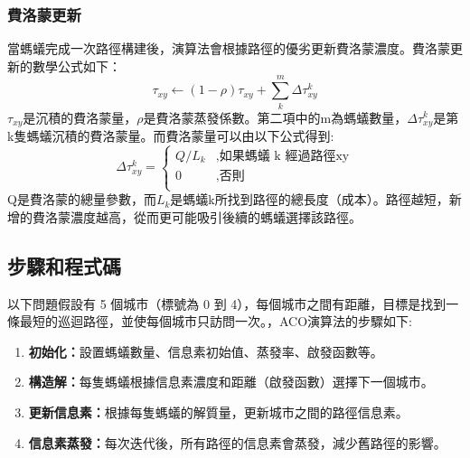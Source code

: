 \subsubsection{費洛蒙更新}
當螞蟻完成一次路徑構建後，演算法會根據路徑的優劣更新費洛蒙濃度。費洛蒙更新的數學公式如下：
\begin{equation} \label{eq:ACO_update}
   \tau_{xy} \leftarrow (1-\rho)\tau_{xy} + \sum_{k}^{m} \Delta \tau^{k}_{xy}
\end{equation}
$\tau_{xy}$是沉積的費洛蒙量，$\rho$是費洛蒙蒸發係數。第二項中的m為螞蟻數量，$\Delta \tau^{k}_{xy}$是第k隻螞蟻沉積的費洛蒙量。而費洛蒙量可以由以下公式得到:
\begin{equation} \label{eq:ACO_delta}
    \Delta \tau^{k}_{xy} = 
        \begin{cases}
        Q / L_k & ,\text{如果螞蟻 k 經過路徑xy} \\
        0 & ,\text{否則} \\
        \end{cases}
\end{equation}
Q是費洛蒙的總量參數，而$L_k$是螞蟻k所找到路徑的總長度（成本）。路徑越短，新增的費洛蒙濃度越高，從而更可能吸引後續的螞蟻選擇該路徑。
\subsection{步驟和程式碼}
以下問題假設有 5 個城市（標號為 0 到 4），每個城市之間有距離，目標是找到一條最短的巡迴路徑，並使每個城市只訪問一次。，ACO演算法的步驟如下:
\begin{enumerate}
    \item  \textbf{初始化：}設置螞蟻數量、信息素初始值、蒸發率、啟發函數等。
    \item  \textbf{構造解：}每隻螞蟻根據信息素濃度和距離（啟發函數）選擇下一個城市。
    \item  \textbf{更新信息素：}根據每隻螞蟻的解質量，更新城市之間的路徑信息素。
    \item  \textbf{信息素蒸發：}每次迭代後，所有路徑的信息素會蒸發，減少舊路徑的影響。
\end{enumerate}

